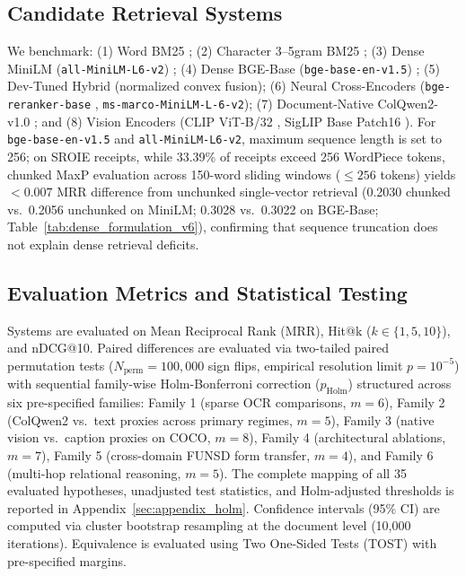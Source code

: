 \subsection{Candidate Retrieval Systems}
We benchmark: (1) Word BM25 \cite{robertson2009bm25}; (2) Character 3--5gram BM25 \cite{mcnamee2004character}; (3) Dense MiniLM (\texttt{all-MiniLM-L6-v2}) \cite{reimers2019sbert}; (4) Dense BGE-Base (\texttt{bge-base-en-v1.5}) \cite{xiao2023bge}; (5) Dev-Tuned Hybrid (normalized convex fusion); (6) Neural Cross-Encoders (\texttt{bge-reranker-base} \cite{xiao2023bge}, \texttt{ms-marco-MiniLM-L-6-v2}); (7) Document-Native ColQwen2-v1.0 \cite{faysse2024colqwen2}; and (8) Vision Encoders (CLIP ViT-B/32 \cite{radford2021clip}, SigLIP Base Patch16 \cite{zhai2023siglip}). For \texttt{bge-base-en-v1.5} and \texttt{all-MiniLM-L6-v2}, maximum sequence length is set to 256; on SROIE receipts, while 33.39\% of receipts exceed 256 WordPiece tokens, chunked MaxP evaluation across 150-word sliding windows ($\le 256$ tokens) yields $<0.007$ MRR difference from unchunked single-vector retrieval (0.2030 chunked vs.\ 0.2056 unchunked on MiniLM; 0.3028 vs.\ 0.3022 on BGE-Base; Table~\ref{tab:dense_formulation_v6}), confirming that sequence truncation does not explain dense retrieval deficits.

\subsection{Evaluation Metrics and Statistical Testing}
Systems are evaluated on Mean Reciprocal Rank (MRR), Hit@k ($k \in \{1, 5, 10\}$), and nDCG@10. Paired differences are evaluated via two-tailed paired permutation tests ($N_{\text{perm}}=100{,}000$ sign flips, empirical resolution limit $p = 10^{-5}$) with sequential family-wise Holm-Bonferroni correction ($p_{\text{Holm}}$) structured across six pre-specified families: Family 1 (sparse OCR comparisons, $m=6$), Family 2 (ColQwen2 vs.\ text proxies across primary regimes, $m=5$), Family 3 (native vision vs.\ caption proxies on COCO, $m=8$), Family 4 (architectural ablations, $m=7$), Family 5 (cross-domain FUNSD form transfer, $m=4$), and Family 6 (multi-hop relational reasoning, $m=5$). The complete mapping of all 35 evaluated hypotheses, unadjusted test statistics, and Holm-adjusted thresholds is reported in Appendix~\ref{sec:appendix_holm}. Confidence intervals (95\% CI) are computed via cluster bootstrap resampling at the document level (10,000 iterations). Equivalence is evaluated using Two One-Sided Tests (TOST) with pre-specified margins.

